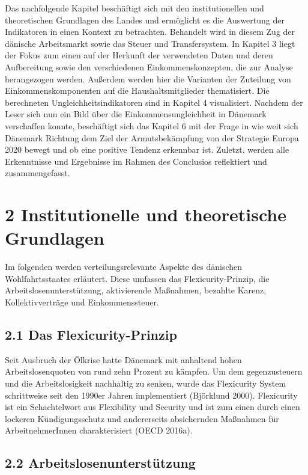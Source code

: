 \documentclass[ngerman,]{article}
\begin{document}
Das nachfolgende Kapitel beschäftigt sich mit den institutionellen und
theoretischen Grundlagen des Landes und ermöglicht es die Auswertung der
Indikatoren in einen Kontext zu betrachten. Behandelt wird in diesem Zug
der dänische Arbeitsmarkt sowie das Steuer und Transfersystem. In
Kapitel 3 liegt der Fokus zum einen auf der Herkunft der verwendeten
Daten und deren Aufbereitung sowie den verschiedenen
Einkommenskonzepten, die zur Analyse herangezogen werden. Außerdem
werden hier die Varianten der Zuteilung von Einkommenskomponenten auf
die Haushaltsmitglieder thematisiert. Die berechneten
Ungleichheitsindikatoren sind in Kapitel 4 visualisiert. Nachdem der
Leser sich nun ein Bild über die Einkommensungleichheit in Dänemark
verschaffen konnte, beschäftigt sich das Kapitel 6 mit der Frage in wie
weit sich Dänemark Richtung dem Ziel der Armutsbekämpfung von der
Strategie Europa 2020 bewegt und ob eine positive Tendenz erkennbar ist.
Zuletzt, werden alle Erkenntnisse und Ergebnisse im Rahmen des
Conclusios reflektiert und zusammengefasst.

\section{2 Institutionelle und theoretische
Grundlagen}\label{institutionelle-und-theoretische-grundlagen}

Im folgenden werden verteilungsrelevante Aspekte des dänischen
Wohlfahrtsstaates erläutert. Diese umfassen das Flexicurity-Prinzip, die
Arbeitslosenunterstützung, aktivierende Maßnahmen, bezahlte Karenz,
Kollektivverträge und Einkommenssteuer.

\subsection{2.1 Das Flexicurity-Prinzip}\label{das-flexicurity-prinzip}

Seit Ausbruch der Ölkrise hatte Dänemark mit anhaltend hohen
Arbeitslosenquoten von rund zehn Prozent zu kämpfen. Um dem
gegenzusteuern und die Arbeitslosigkeit nachhaltig zu senken, wurde das
Flexicurity System schrittweise seit den 1990er Jahren implementiert
(Björklund 2000). Flexicurity ist ein Schachtelwort aus Flexibility und
Security und ist zum einen durch einen lockeren Kündigungsschutz und
andererseits absichernden Maßnahmen für ArbeitnehmerInnen
charakterisiert (OECD 2016a).

\subsection{2.2
Arbeitslosenunterstützung}\label{arbeitslosenunterstutzung}
\end{document}
